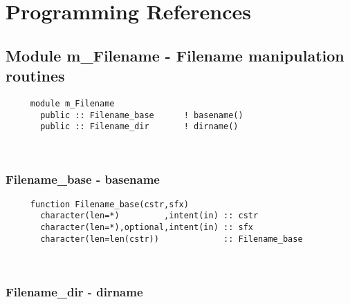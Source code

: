 \appendix
{}
 
  
\newpage
%
% 
\section{Programming References} \label{app:ProLogues}
%
  \subsection{Module m\_Filename - Filename manipulation routines }
  
\begin{verbatim} 
     module m_Filename
       public :: Filename_base		! basename()
       public :: Filename_dir		! dirname()
 \end{verbatim}
%
 
 
\mbox{}\hrulefill\ 

  \subsubsection{Filename\_base - basename}
  
\begin{verbatim} 
     function Filename_base(cstr,sfx)
       character(len=*)         ,intent(in) :: cstr
       character(len=*),optional,intent(in) :: sfx
       character(len=len(cstr))             :: Filename_base
 \end{verbatim}
%
 
 
\mbox{}\hrulefill\ 
 

  \subsubsection{Filename\_dir - dirname}

